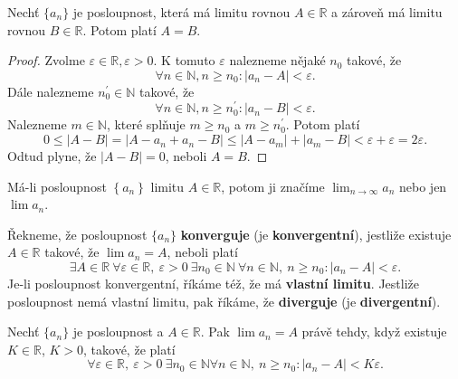 \begin{veta}\label{veta2.1}
Nechť $\{a_n\}$ je posloupnost, která má limitu rovnou $A \in \mathbb{R}$ a zároveň má
limitu rovnou $B \in \mathbb{R}$. Potom platí $A = B$.
\end{veta}

\begin{proof}
	Zvolme $\varepsilon \in \mathbb R , \varepsilon > 0$. K tomuto $\varepsilon$ nalezneme nějaké $n_0$
	takové, že
	$$
	    \forall n\in \mathbb N , n \geq n_0: |a_n-A|<\varepsilon.
	$$
	Dále nalezneme $n_0^\prime\in \mathbb N $ takové, že
	$$
	    \forall n\in \mathbb N , n \geq n_0^\prime: |a_n - B|<\varepsilon.
	$$
	Nalezneme $m\in \mathbb N $, které splňuje $m\geq n_0$ a $m \geq n_0^\prime$. Potom platí
	$$
	    0\leq |A-B| = |A-a_n+a_n-B|\leq |A-a_m|+|a_m-B| < \varepsilon + \varepsilon = 2\varepsilon.
	$$
	Odtud plyne, že $|A-B|=0$, neboli $A=B$.
\end{proof}

\begin{oznaceni}
	Má-li posloupnost $\left \{ a_n \right \}$ limitu $A\in \mathbb R $, potom ji značíme
$\lim_{n \to \infty} a_n$ nebo jen $\lim a_n$.
\end{oznaceni}

\begin{definice}
Řekneme, že posloupnost $\{a_n\}$ \textbf{konverguje} (je \textbf{konvergentní}), jestliže existuje
$A \in \mathbb{R}$ takové, že $\lim a_n = A$, neboli platí
\[
\exists A \in \mathbb{R} \ \forall \varepsilon \in \mathbb{R}, \ \varepsilon > 0
\ \exists n_0 \in \mathbb{N} \ \forall n \in \mathbb{N}, \ n \ge n_0 :
|a_n - A| < \varepsilon.
\]
Je-li posloupnost konvergentní, říkáme též, že má \textbf{vlastní limitu}.
Jestliže posloupnost nemá vlastní limitu, pak říkáme, že \textbf{diverguje}
(je \textbf{divergentní}).
\end{definice}

\begin{lemma}\label{lemma 2.2}
Nechť $\{a_n\}$ je posloupnost a $A \in \mathbb{R}$. Pak $\lim a_n = A$ právě tehdy,
když existuje $K \in \mathbb{R}$, $K > 0$, takové, že platí
\[
\forall \varepsilon \in \mathbb{R}, \ \varepsilon > 0 \ \exists n_0 \in \mathbb{N}
 \forall n \in \mathbb{N}, \ n \ge n_0 : |a_n - A| < K\varepsilon.
\]
\end{lemma}

